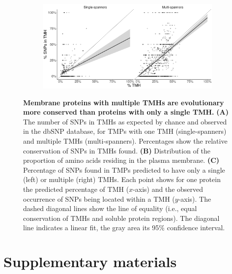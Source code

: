 \begin{figure}[!htbp]
  \vfill
  
  \begin{subfigure}[t]{\textwidth}
    \centering
    \caption{}
    \includegraphics[width=\linewidth]{ncbi_peregrine_results/fig_f_snps_found_and_expected_per_spanner_bw.png}
    \label{fig:f_snps_found_and_expected_per_spanner}
  \end{subfigure}
  \caption{ \textbf{Membrane proteins with multiple TMHs are evolutionary more conserved than proteins with only a single TMH.}
      \textbf{(A)} 
      The number of SNPs in TMHs as expected by chance 
      and observed in the dbSNP database, 
      for TMPs with one TMH (single-spanners) and multiple TMHs (multi-spanners).
      Percentages show the relative conservation
      of SNPs in TMHs found.
      \textbf{(B)} 
      Distribution of the proportion of amino acids residing
      in the plasma membrane. 
      \textbf{(C)} 
      Percentage of SNPs found in TMPs predicted to have only a single
      (left) or multiple (right) TMHs.
        Each point shows for one protein the predicted percentage of TMH ($x$-axis) and the observed occurrence of SNPs being located within a TMH ($y$-axis). The dashed diagonal lines show the line of equality (i.e., equal conservation of TMHs and soluble protein regions). 
        The diagonal line indicates a linear fit, the gray area its 95\% confidence interval.
     }
\end{figure}

\clearpage

\newpage
\appendix
\section{Supplementary materials}

\renewcommand{\thefigure}{S\arabic{figure}}
\setcounter{figure}{0}

